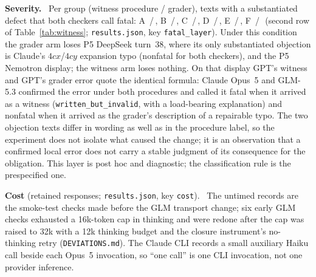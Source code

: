 \textbf{Severity.} \WITNESSFATALTXT\ Per group (witness procedure / grader), texts with a substantiated defect that both checkers call fatal: A \WITNESSSUBFATA\,/\,\GRADERSUBFATA, B \WITNESSSUBFATB\,/\,\GRADERSUBFATB, C \WITNESSSUBFATC\,/\,\GRADERSUBFATC, D \WITNESSSUBFATD\,/\,\GRADERSUBFATD, E \WITNESSSUBFATE\,/\,\GRADERSUBFATE, F \WITNESSSUBFATF\,/\,\GRADERSUBFATF\ (second row of Table~\ref{tab:witness}; \texttt{results.json}, key \texttt{fatal\_layer}). Under this condition the grader arm loses P5 DeepSeek turn~38, where its only substantiated objection is Claude's $4cx$/$4cy$ expansion typo (nonfatal for both checkers), and the P5 Nemotron display; the witness arm loses nothing. On that display GPT's witness and GPT's grader error quote the identical formula: Claude Opus~5 and GLM-5.3 confirmed the error under both procedures and called it fatal when it arrived as a witness (\texttt{written\_but\_invalid}, with a load-bearing explanation) and nonfatal when it arrived as the grader's description of a repairable typo. The two objection texts differ in wording as well as in the procedure label, so the experiment does not isolate what caused the change; it is an observation that a confirmed local error does not carry a stable judgment of its consequence for the obligation. This layer is post hoc and diagnostic; the classification rule is the prespecified one.

\textbf{Cost} (retained responses; \texttt{results.json}, key \texttt{cost}). \WITNESSCOSTTXT\ The untimed records are the smoke-test checks made before the GLM transport change; six early GLM checks exhausted a 16k-token cap in thinking and were redone after the cap was raised to 32k with a 12k thinking budget and the closure instrument's no-thinking retry (\texttt{DEVIATIONS.md}). The Claude CLI records a small auxiliary Haiku call beside each Opus~5 invocation, so ``one call'' is one CLI invocation, not one provider inference.


\begin{table}[htbp]\centering\footnotesize
\caption{Witness discovery: texts per group with each outcome, witness procedure / ordinary grader. A credited-defective; B documented-defective, never credited; C alarm flags without record; D replication flips; E high-grade agreement controls; F low control.}
\label{tab:witness}
\WITNESSSUMMARYTABLE
\end{table}

\begin{table}[htbp]\centering\footnotesize
\caption{Witness discovery per text: $S_{\mathrm{valid}}$ (witness procedure) or grade (ordinary grader) followed by the class of the text's best objection: \textbf{S} substantiated defect, L localized concern, U unsupported allegation, ? unresolved, -- no objection.}
\label{tab:witness-cases}
\WITNESSTABLE
\end{table}

